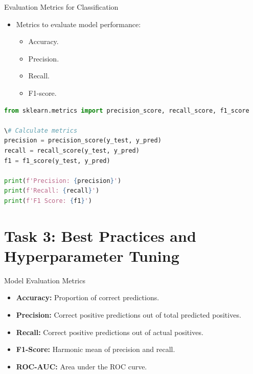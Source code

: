 \documentclass{beamer}
\begin{document}
\begin{frame}{Evaluation Metrics for Classification}
\begin{itemize}
    \item Metrics to evaluate model performance:
    \begin{itemize}
        \item Accuracy.
        \item Precision.
        \item Recall.
        \item F1-score.
    \end{itemize}
\end{itemize}
\begin{lstlisting}[language=Python, caption=Calculating Evaluation Metrics]
from sklearn.metrics import precision_score, recall_score, f1_score

\# Calculate metrics
precision = precision_score(y_test, y_pred)
recall = recall_score(y_test, y_pred)
f1 = f1_score(y_test, y_pred)

print(f'Precision: {precision}')
print(f'Recall: {recall}')
print(f'F1 Score: {f1}')
\end{lstlisting}
\end{frame}

\section{Task 3: Best Practices and Hyperparameter Tuning}

\begin{frame}{Model Evaluation Metrics}
\begin{itemize}
    \item \textbf{Accuracy:} Proportion of correct predictions.
    \item \textbf{Precision:} Correct positive predictions out of total predicted positives.
    \item \textbf{Recall:} Correct positive predictions out of actual positives.
    \item \textbf{F1-Score:} Harmonic mean of precision and recall.
    \item \textbf{ROC-AUC:} Area under the ROC curve.
\end{itemize}
\end{frame}
\end{document}
